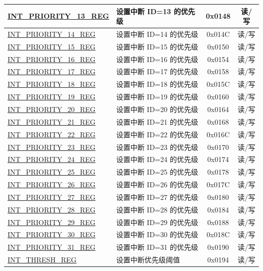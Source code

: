 \begin{longtable}{ | p{4.0cm} | p{8.4cm} | c | c| }
\hyperref[regdesc:INTPRIORITYREG]{INT\_PRIORITY\_13\_REG} & 设置中断 ID=13 的优先级 & 0x0148 & 读/写 \\\hline
\hyperref[regdesc:INTPRIORITYREG]{INT\_PRIORITY\_14\_REG} & 设置中断 ID=14 的优先级 & 0x014C & 读/写 \\\hline
\hyperref[regdesc:INTPRIORITYREG]{INT\_PRIORITY\_15\_REG} & 设置中断 ID=15 的优先级 & 0x0150 & 读/写 \\\hline
\hyperref[regdesc:INTPRIORITYREG]{INT\_PRIORITY\_16\_REG} & 设置中断 ID=16 的优先级 & 0x0154 & 读/写 \\\hline
\hyperref[regdesc:INTPRIORITYREG]{INT\_PRIORITY\_17\_REG} & 设置中断 ID=17 的优先级 & 0x0158 & 读/写 \\\hline
\hyperref[regdesc:INTPRIORITYREG]{INT\_PRIORITY\_18\_REG} & 设置中断 ID=18 的优先级 & 0x015C & 读/写 \\\hline
\hyperref[regdesc:INTPRIORITYREG]{INT\_PRIORITY\_19\_REG} & 设置中断 ID=19 的优先级 & 0x0160 & 读/写 \\\hline
\hyperref[regdesc:INTPRIORITYREG]{INT\_PRIORITY\_20\_REG} & 设置中断 ID=20 的优先级 & 0x0164 & 读/写 \\\hline
\hyperref[regdesc:INTPRIORITYREG]{INT\_PRIORITY\_21\_REG} & 设置中断 ID=21 的优先级 & 0x0168 & 读/写 \\\hline
\hyperref[regdesc:INTPRIORITYREG]{INT\_PRIORITY\_22\_REG} & 设置中断 ID=22 的优先级 & 0x016C & 读/写 \\\hline
\hyperref[regdesc:INTPRIORITYREG]{INT\_PRIORITY\_23\_REG} & 设置中断 ID=23 的优先级 & 0x0170 & 读/写 \\\hline
\hyperref[regdesc:INTPRIORITYREG]{INT\_PRIORITY\_24\_REG} & 设置中断 ID=24 的优先级 & 0x0174 & 读/写 \\\hline
\hyperref[regdesc:INTPRIORITYREG]{INT\_PRIORITY\_25\_REG} & 设置中断 ID=25 的优先级 & 0x0178 & 读/写 \\\hline
\hyperref[regdesc:INTPRIORITYREG]{INT\_PRIORITY\_26\_REG} & 设置中断 ID=26 的优先级 & 0x017C & 读/写 \\\hline
\hyperref[regdesc:INTPRIORITYREG]{INT\_PRIORITY\_27\_REG} & 设置中断 ID=27 的优先级 & 0x0180 & 读/写 \\\hline
\hyperref[regdesc:INTPRIORITYREG]{INT\_PRIORITY\_28\_REG} & 设置中断 ID=28 的优先级 & 0x0184 & 读/写 \\\hline
\hyperref[regdesc:INTPRIORITYREG]{INT\_PRIORITY\_29\_REG} & 设置中断 ID=29 的优先级 & 0x0188 & 读/写 \\\hline
\hyperref[regdesc:INTPRIORITYREG]{INT\_PRIORITY\_30\_REG} & 设置中断 ID=30 的优先级 & 0x018C & 读/写 \\\hline
\hyperref[regdesc:INTPRIORITYREG]{INT\_PRIORITY\_31\_REG} & 设置中断 ID=31 的优先级 & 0x0190 & 读/写 \\\hline
\hyperref[regdesc:INTTHRESHREG]{INT\_THRESH\_REG} & 设置中断优先级阈值 & 0x0194 & 读/写 \\\hline
\end{longtable}
